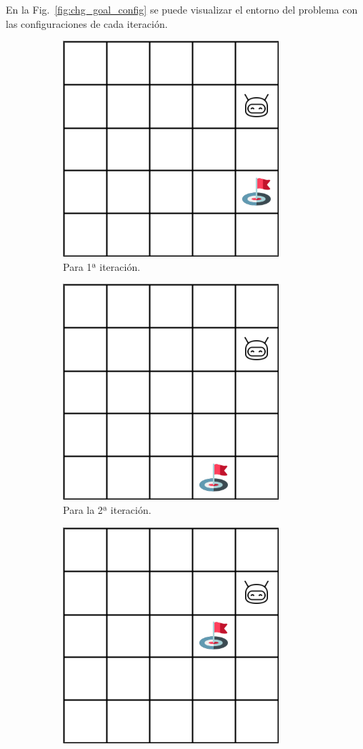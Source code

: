 En la Fig.~\ref{fig:chg_goal_config} se puede visualizar el entorno del problema con las configuraciones de cada iteración. \\

\begin{figure}
    \centering
    \begin{subfigure}{.35\textwidth}
        \centering
        \includegraphics[scale=0.35]{cap5_experimentacion/images/chg_goal_it1.png}
        \caption{Para 1ª iteración.}
        \label{fig:chg_goal_it1}
    \end{subfigure}%
    \begin{subfigure}{.35\textwidth}
        \centering
        \includegraphics[scale=0.35]{cap5_experimentacion/images/chg_goal_it2.png}
        \caption{Para la 2ª iteración.}
        \label{fig:chg_goal_it2}
    \end{subfigure}%
    \begin{subfigure}{.35\textwidth}
        \centering
        \includegraphics[scale=0.35]{cap5_experimentacion/images/chg_goal_it3.png}

\end{subfigure}
\end{figure}
